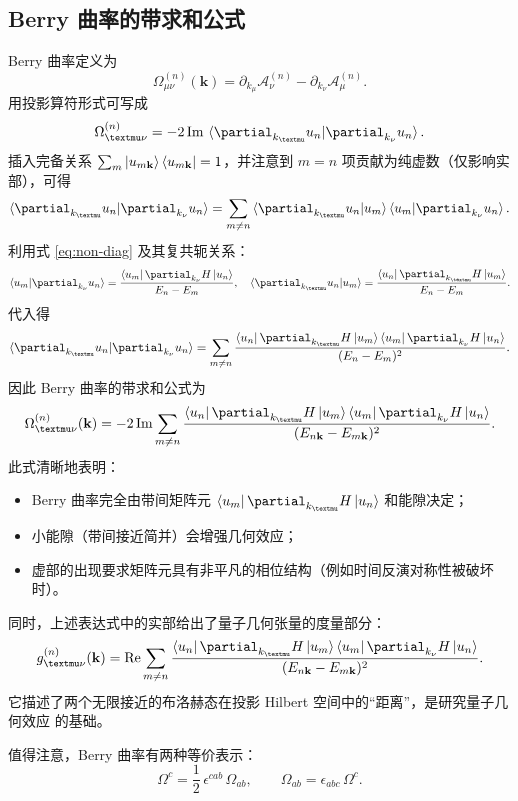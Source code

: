 \subsection{Berry 曲率的带求和公式}
Berry 曲率定义为
\[
\Omega^{(n)}_{\mu\nu}(\mathbf{k}) = \partial_{k_\mu}\mathcal{A}^{(n)}_\nu - \partial_{k_\nu}\mathcal{A}^{(n)}_\mu.
\]
用投影算符形式可写成
\[
\Omega^{(n)}_{\mu\nu} = -2\,\mathrm{Im}\, \braket{\partial_{k_\mu} u_{n} | \partial_{k_\nu} u_{n}}.
\]
插入完备关系 \(\sum_m \ket{u_{m\mathbf{k}}}\bra{u_{m\mathbf{k}}} = 1\)，并注意到 \(m=n\) 项贡献为纯虚数（仅影响实部），可得
\[
\braket{\partial_{k_\mu} u_{n} | \partial_{k_\nu} u_{n}} = \sum_{m \neq n} \braket{\partial_{k_\mu} u_{n} | u_{m}} \braket{u_{m} | \partial_{k_\nu} u_{n}}.
\]
利用式 \eqref{eq:non-diag} 及其复共轭关系：
\[
\braket{u_{m} | \partial_{k_\nu} u_{n}} = \frac{ \bra{u_{m}} \partial_{k_\nu} H \ket{u_{n}} }{ E_{n}-E_{m} }, \quad
\braket{\partial_{k_\mu} u_{n} | u_{m}} = \frac{ \bra{u_{n}} \partial_{k_\mu} H \ket{u_{m}} }{ E_{n}-E_{m} }.
\]
代入得
\[
\braket{\partial_{k_\mu} u_{n} | \partial_{k_\nu} u_{n}} = \sum_{m \neq n} \frac{ \bra{u_{n}} \partial_{k_\mu} H \ket{u_{m}} \bra{u_{m}} \partial_{k_\nu} H \ket{u_{n}} }{ (E_{n}-E_{m})^2 }.
\]
因此 Berry 曲率的带求和公式为
\begin{equation}
\Omega^{(n)}_{\mu\nu}(\mathbf{k}) = -2\,\mathrm{Im} \sum_{m \neq n} \frac{ \bra{u_{n}} \partial_{k_\mu} H \ket{u_{m}} \bra{u_{m}} \partial_{k_\nu} H \ket{u_{n}} }{ (E_{n\mathbf{k}}-E_{m\mathbf{k}})^2 }. 
\end{equation}
此式清晰地表明：
\begin{itemize}
    \item Berry 曲率完全由带间矩阵元 \(\bra{u_m} \partial_{k_\mu} H \ket{u_n}\) 和能隙决定；
    \item 小能隙（带间接近简并）会增强几何效应；
    \item 虚部的出现要求矩阵元具有非平凡的相位结构（例如时间反演对称性被破坏时）。
\end{itemize}

同时，上述表达式中的实部给出了量子几何张量的度量部分：
\[
g^{(n)}_{\mu\nu}(\mathbf{k}) = \mathrm{Re} \sum_{m \neq n} \frac{ \bra{u_{n}} \partial_{k_\mu} H \ket{u_{m}} \bra{u_{m}} \partial_{k_\nu} H \ket{u_{n}} }{ (E_{n\mathbf{k}}-E_{m\mathbf{k}})^2 }.
\]
它描述了两个无限接近的布洛赫态在投影 Hilbert 空间中的“距离”，是研究量子几何效应
的基础。

值得注意，Berry 曲率有两种等价表示：
\[
\Omega^c = \frac12\,\epsilon^{cab}\,\Omega_{ab},
\qquad
\Omega_{ab} = \epsilon_{abc}\,\Omega^c.
\]




